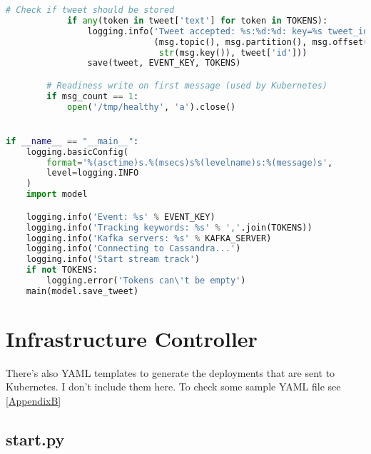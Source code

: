 \begin{lstlisting}[language=Python]
            # Check if tweet should be stored
            if any(token in tweet['text'] for token in TOKENS):
                logging.info('Tweet accepted: %s:%d:%d: key=%s tweet_id=%s' %
                             (msg.topic(), msg.partition(), msg.offset(),
                              str(msg.key()), tweet['id']))
                save(tweet, EVENT_KEY, TOKENS)

        # Readiness write on first message (used by Kubernetes)
        if msg_count == 1:
            open('/tmp/healthy', 'a').close()


if __name__ == "__main__":
    logging.basicConfig(
        format='%(asctime)s.%(msecs)s%(levelname)s:%(message)s',
        level=logging.INFO
    )
    import model

    logging.info('Event: %s' % EVENT_KEY)
    logging.info('Tracking keywords: %s' % ','.join(TOKENS))
    logging.info('Kafka servers: %s' % KAFKA_SERVER)
    logging.info('Connecting to Cassandra...')
    logging.info('Start stream track')
    if not TOKENS:
        logging.error('Tokens can\'t be empty')
    main(model.save_tweet)

\end{lstlisting}
\newpage
\section{Infrastructure Controller}

There's also YAML templates to generate the deployments that are sent to Kubernetes. I don't include them here. To check some sample YAML file see \autoref{AppendixB}

\subsection{start.py}

